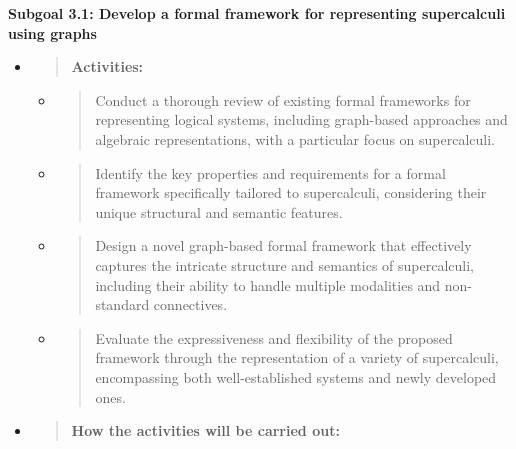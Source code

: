 \textbf{Subgoal 3.1: Develop a formal framework for representing
supercalculi using graphs}

\begin{itemize}
\item
  \begin{quote}
  \textbf{Activities:\\
  }
  \end{quote}

  \begin{itemize}
  \item
    \begin{quote}
    Conduct a thorough review of existing formal frameworks for
    representing logical systems, including graph-based approaches and
    algebraic representations, with a particular focus on supercalculi.
    \end{quote}
  \item
    \begin{quote}
    Identify the key properties and requirements for a formal framework
    specifically tailored to supercalculi, considering their unique
    structural and semantic features.
    \end{quote}
  \item
    \begin{quote}
    Design a novel graph-based formal framework that effectively
    captures the intricate structure and semantics of supercalculi,
    including their ability to handle multiple modalities and
    non-standard connectives.
    \end{quote}
  \item
    \begin{quote}
    Evaluate the expressiveness and flexibility of the proposed
    framework through the representation of a variety of supercalculi,
    encompassing both well-established systems and newly developed ones.
    \end{quote}
  \end{itemize}
\item
  \begin{quote}
  \textbf{How the activities will be carried out:\\
  }
  \end{quote}


\end{itemize}
